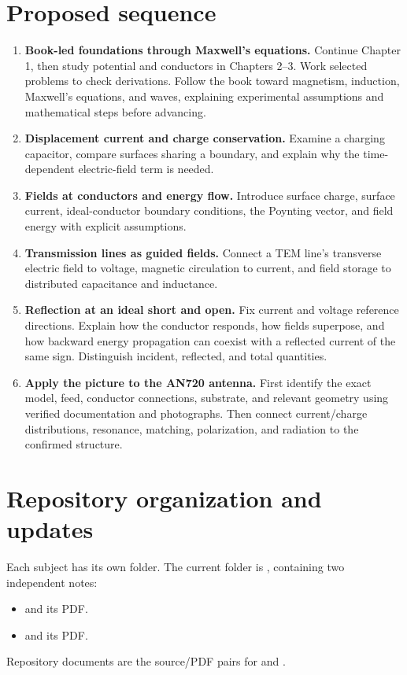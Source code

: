 \documentclass[11pt,letterpaper]{article}
\begin{document}
\newpage
\section*{Proposed sequence}
\begin{enumerate}
\item \textbf{Book-led foundations through Maxwell's equations.} Continue Chapter 1, then study potential and conductors in Chapters 2--3. Work selected problems to check derivations. Follow the book toward magnetism, induction, Maxwell's equations, and waves, explaining experimental assumptions and mathematical steps before advancing.
\item \textbf{Displacement current and charge conservation.} Examine a charging capacitor, compare surfaces sharing a boundary, and explain why the time-dependent electric-field term is needed.
\item \textbf{Fields at conductors and energy flow.} Introduce surface charge, surface current, ideal-conductor boundary conditions, the Poynting vector, and field energy with explicit assumptions.
\item \textbf{Transmission lines as guided fields.} Connect a TEM line's transverse electric field to voltage, magnetic circulation to current, and field storage to distributed capacitance and inductance.
\item \textbf{Reflection at an ideal short and open.} Fix current and voltage reference directions. Explain how the conductor responds, how fields superpose, and how backward energy propagation can coexist with a reflected current of the same sign. Distinguish incident, reflected, and total quantities.
\item \textbf{Apply the picture to the AN720 antenna.} First identify the exact model, feed, conductor connections, substrate, and relevant geometry using verified documentation and photographs. Then connect current/charge distributions, resonance, matching, polarization, and radiation to the confirmed structure.
\end{enumerate}

\section*{Repository organization and updates}
Each subject has its own folder. The current folder is , containing two independent notes:
\begin{itemize}
\item {} and its PDF.
\item {} and its PDF.
\end{itemize}
Repository documents are the source/PDF pairs for  and .
\end{document}
